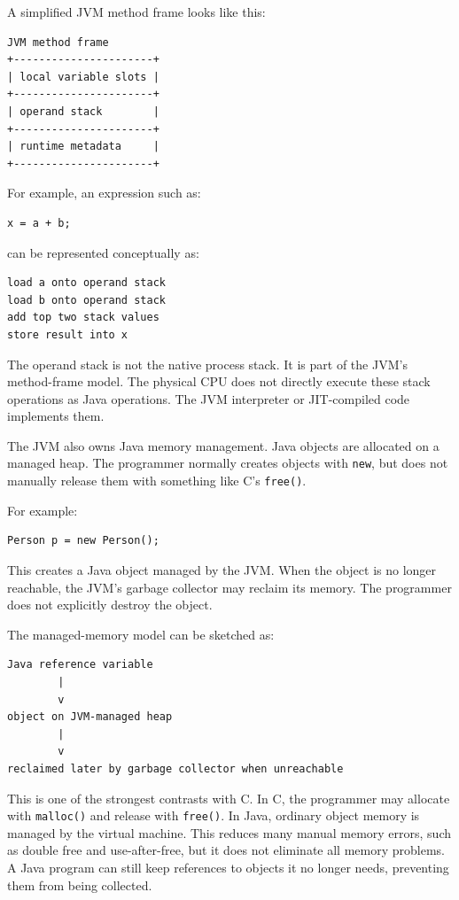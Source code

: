 A simplified JVM method frame looks like this:

\begin{verbatim}
JVM method frame
+----------------------+
| local variable slots |
+----------------------+
| operand stack        |
+----------------------+
| runtime metadata     |
+----------------------+
\end{verbatim}

For example, an expression such as:

\begin{verbatim}
x = a + b;
\end{verbatim}

can be represented conceptually as:

\begin{verbatim}
load a onto operand stack
load b onto operand stack
add top two stack values
store result into x
\end{verbatim}

The operand stack is not the native process stack. It is part of the JVM's method-frame model. The physical CPU does not directly execute these stack operations as Java operations. The JVM interpreter or JIT-compiled code implements them.

The JVM also owns Java memory management. Java objects are allocated on a managed heap. The programmer normally creates objects with \texttt{new}, but does not manually release them with something like C's \texttt{free()}.

For example:

\begin{verbatim}
Person p = new Person();
\end{verbatim}

This creates a Java object managed by the JVM. When the object is no longer reachable, the JVM's garbage collector may reclaim its memory. The programmer does not explicitly destroy the object.

The managed-memory model can be sketched as:

\begin{verbatim}
Java reference variable
        |
        v
object on JVM-managed heap
        |
        v
reclaimed later by garbage collector when unreachable
\end{verbatim}

This is one of the strongest contrasts with C. In C, the programmer may allocate with \texttt{malloc()} and release with \texttt{free()}. In Java, ordinary object memory is managed by the virtual machine. This reduces many manual memory errors, such as double free and use-after-free, but it does not eliminate all memory problems. A Java program can still keep references to objects it no longer needs, preventing them from being collected.

